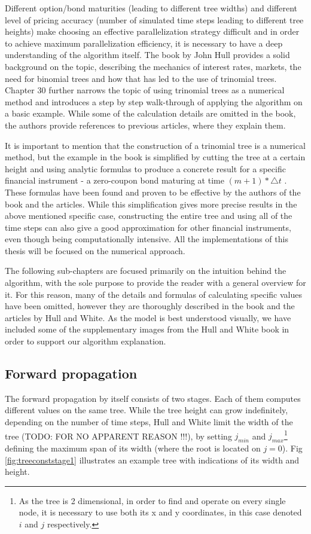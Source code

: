 Different option/bond maturities (leading to different tree widths) and different level of pricing accuracy (number of simulated time steps leading to different tree heights) make choosing an effective parallelization strategy difficult and in order to achieve maximum parallelization efficiency, it is necessary to have a deep understanding of the algorithm itself. The book by John Hull\cite{ofod} provides a solid background on the topic, describing the mechanics of interest rates, markets, the need for binomial trees and how that has led to the use of trinomial trees. Chapter 30 further narrows the topic of using trinomial trees as a numerical method and introduces a step by step walk-through of applying the algorithm on a basic example. While some of the calculation details are omitted in the book, the authors provide references to previous articles\cite{npfits}\cite{uhwirt}, where they explain them. 

It is important to mention that the construction of a trinomial tree is a numerical method, but the example in the book is simplified by cutting the tree at a certain height and using analytic formulas to produce a concrete result for a specific financial instrument - a zero-coupon bond maturing at time $(m + 1) * \triangle t$ \cite[pg. 704]{ofod}. These formulas have been found and proven to be effective by the authors of the book and the articles. While this simplification gives more precise results in the above mentioned specific case, constructing the entire tree and using all of the time steps can also give a good approximation for other financial instruments, even though being computationally intensive. All the implementations of this thesis will be focused on the numerical approach.

The following sub-chapters are focused primarily on the intuition behind the algorithm, with the sole purpose to provide the reader with a general overview for it. For this reason, many of the details and formulas of calculating specific values have been omitted, however they are thoroughly described in the book and the articles by Hull and White. As the model is best understood visually, we have included some of the supplementary images from the Hull and White book in order to support our algorithm explanation. 

\subsection{Forward propagation}
The forward propagation by itself consists of two stages. Each of them computes different values on the same tree. While the tree height can grow indefinitely, depending on the number of time steps, Hull and White limit the width of the tree (TODO: FOR NO APPARENT REASON !!!), by setting $j_{min}$ and $j_{max}$\footnote{As the tree is 2 dimensional, in order to find and operate on every single node, it is necessary to use both its x and y coordinates, in this case denoted $i$ and $j$ respectively.} defining the maximum span of its width (where the root is located on $j=0$). Fig \ref{fig:treeconststage1} illustrates an example tree with indications of its width and height. 

